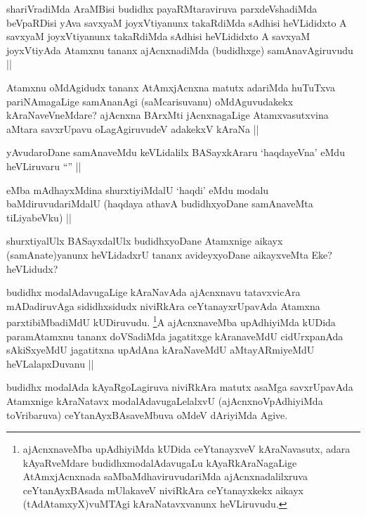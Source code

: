 \begin{artha}
shariVradiMda AraMBisi budidhx payaRMtaraviruva parxdeVshadiMda beVpaRDisi yAva savxyaM joyxVtiyanunx takaRdiMda sAdhisi heVLididxto A savxyaM joyxVtiyanunx takaRdiMda sAdhisi heVLididxto A savxyaM joyxVtiyAda Atamxnu tananx ajAcnxnadiMda (budidhxge) samAnavAgiruvudu ||
\end{artha}

\begin{artha}
Atamxnu oMdAgidudx tananx AtAmxjAcnxna matutx adariMda huTuTxva pariNAmagaLige samAnanAgi (saMcarisuvanu) oMdAguvudakekx kAraNaveVneMdare? ajAcnxna BArxMti jAcnxnagaLige Atamxvasutxvina aMtara savxrUpavu oLagAgiruvudeV adakekxV kAraNa ||
\end{artha}

\begin{artha}
yAvudaroDane samAnaveMdu keVLidalilx BASayxkAraru `haqdayeVna' eMdu heVLiruvaru ``\stext'' ||
\end{artha}

\begin{artha}
eMba mAdhayxMdina shurxtiyiMdalU `haqdi' eMdu modalu baMdiruvudariMdalU (haqdaya athavA budidhxyoDane samAnaveMta tiLiyabeVku) ||
\end{artha}

\begin{artha}
shurxtiyalUlx BASayxdalUlx budidhxyoDane Atamxnige aikayx (samAnate)yanunx heVLidadxrU tananx avideyxyoDane aikayxveMta Eke? heVLidudx?
\end{artha}

\begin{artha}
budidhx modalAdavugaLige kAraNavAda ajAcnxnavu tatavxvicAra mADadiruvAga sididhxsidudx niviRkAra ceYtanayxrUpavAda Atamxna parxtibiMbadiMdU kUDiruvudu. \footnote{ajAcnxnaveMba upAdhiyiMda kUDida ceYtanayxveV kAraNavasutx, adara kAyaRveMdare budidhxmodalAdavugaLu kAyaRkAraNagaLige AtAmxjAcnxnada saMbaMdhaviruvudariMda ajAcnxnadalilxruva ceYtanAyxBAsada mUlakaveV niviRkAra ceYtanayxkekx aikayx (tAdAtamxyX)vuMTAgi kAraNatavxvanunx heVLiruvudu.}A ajAcnxnaveMba upAdhiyiMda kUDida paramAtamxnu tananx doVSadiMda jagatitxge kAranaveMdU cidUrxpanAda sAkiSxyeMdU jagatitxna upAdAna kAraNaveMdU aMtayARmiyeMdU heVLalapxDuvanu ||
\end{artha}

\begin{artha}
budidhx modalAda kAyaRgoLagiruva niviRkAra matutx asaMga savxrUpavAda Atamxnige kAraNatavx modalAdavugaLelalxvU (ajAcnxnoVpAdhiyiMda toVribaruva) ceYtanAyxBAsaveMbuva oMdeV dAriyiMda Agive.
\end{artha}

